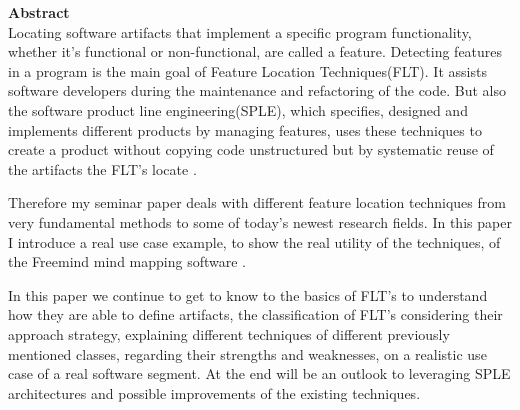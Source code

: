 \vspace*{2cm}

{\bf\Large Abstract} \\ [1em]
Locating software artifacts that implement a specific program functionality, whether it's functional or non-functional, are called a feature. Detecting features in a program is the main goal of Feature Location Techniques(FLT). It assists software developers during the maintenance and refactoring of the code.
But also the software product line engineering(SPLE), which specifies, designed and implements different products by managing features, uses these techniques to create a product without copying code unstructured but by systematic reuse of the artifacts the FLT's locate \cite{pohl2005software}.

Therefore my seminar paper deals with different feature location techniques from very fundamental methods to some of today's newest research fields. In this paper I introduce a real use case example, to show the real utility of the techniques, of the Freemind mind mapping software \cite{FrM16}.

In this paper we continue to get to know to the basics of FLT's to understand how they are able to define artifacts, the classification of FLT's considering their approach strategy, explaining different techniques of different previously mentioned classes, regarding their strengths and weaknesses, on a realistic use case of a real software segment.
At the end will be an outlook to leveraging SPLE architectures and possible improvements of the existing techniques\cite{zhao2006sniafl}.

\cleardoublepage
